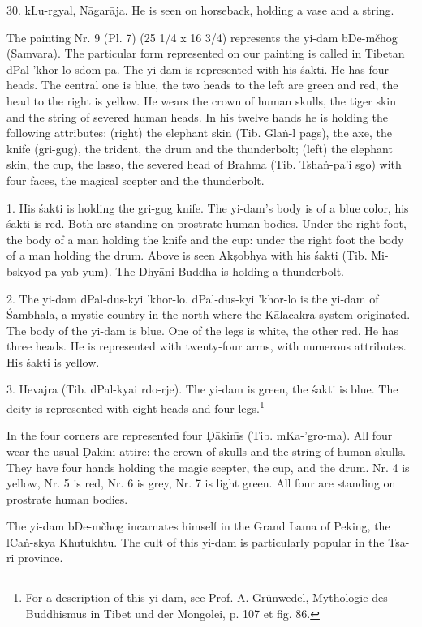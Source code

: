 \documentclass[a4paper, 12pt, oneside]{article}
\begin{document}
30. kLu-rgyal, N\={a}gar\={a}ja. He is seen on horseback, holding a vase and a string.

\bigskip

The painting Nr. 9 (Pl. 7) (25 1/4 x 16 3/4) represents the yi-dam bDe-mčhog (Samvara). The particular form represented on our painting is called in Tibetan dPal 'khor-lo sdom-pa. The yi-dam is represented with his \'{s}akti. He has four heads. The central one is blue, the two heads to the left are green and red, the head to the right is yellow. He wears the crown of human skulls, the tiger skin and the string of severed human heads. In his twelve hands he is holding the following attributes: (right) the elephant skin (Tib. Gla\.{n}-l pags), the axe, the knife (gri-gug), the trident, the drum and the thunderbolt; (left) the elephant skin, the cup, the lasso, the severed head of Brahma (Tib. Tsha\.{n}-pa'i sgo) with four faces, the magical scepter and the thunderbolt.

1. His \'{s}akti is holding the gri-gug knife. The yi-dam's body is of a blue color, his \'{s}akti is red. Both are standing on prostrate human bodies. Under the right foot, the body of a man holding the knife and the cup: under the right foot the body of a man holding the drum. Above is seen Ak\d{s}obhya with his \'{s}akti (Tib. Mi-bskyod-pa yab-yum). The Dhy\={a}ni-Buddha is holding a thunderbolt.

2. The yi-dam dPal-dus-kyi 'khor-lo. dPal-dus-kyi 'khor-lo is the yi-dam of \'{S}ambhala, a mystic country in the north where the K\={a}lacakra system originated. The body of the yi-dam is blue. One of the legs is white, the other red. He has three heads. He is represented with twenty-four arms, with numerous attributes. His \'{s}akti is yellow.

3. Hevajra (Tib. dPal-kyai rdo-rje). The yi-dam is green, the \'{s}akti is blue. The deity is represented with eight heads and four legs.\footnote{For a description of this yi-dam, see Prof. A. Grünwedel, Mythologie des Buddhismus in Tibet und der Mongolei, p. 107 et fig. 86.}

In the four corners are represented four \d{D}\={a}kin\={\i}s (Tib. mKa-'gro-ma). All four wear the usual \d{D}\={a}kin\={\i} attire: the crown of skulls and the string of human skulls. They have four hands holding the magic scepter, the cup, and the drum. Nr. 4 is yellow, Nr. 5 is red, Nr. 6 is grey, Nr. 7 is light green. All four are standing on prostrate human bodies.

The yi-dam bDe-mčhog incarnates himself in the Grand Lama of Peking, the lCa\.{n}-skya Khutukhtu. The cult of this yi-dam is particularly popular in the Tsa-ri province.
\end{document}
